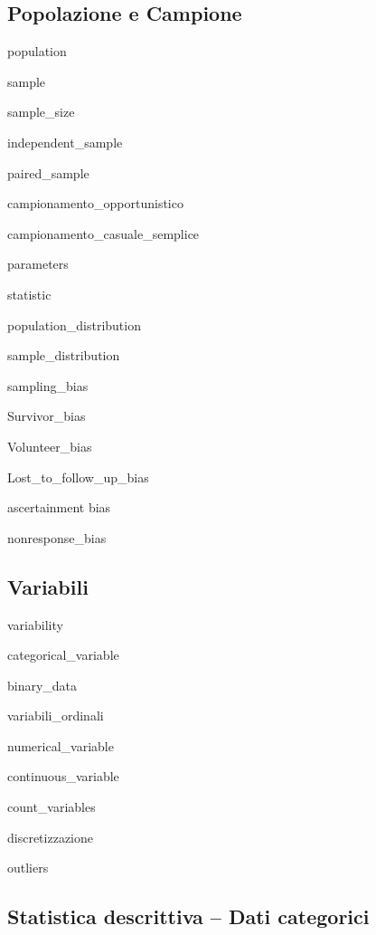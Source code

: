\documentclass{report}
\begin{document}
\subsection*{Popolazione e Campione}

\noindent \gls{population}

\noindent \gls{sample}

\noindent \gls{sample_size}

\noindent \gls{independent_sample}

\noindent \gls{paired_sample}

\noindent \gls{campionamento_opportunistico}

\noindent \gls{campionamento_casuale_semplice}

\noindent \gls{parameters}

\noindent \gls{statistic}

\noindent \gls{population_distribution}

\noindent \gls{sample_distribution}

\noindent \gls{sampling_bias}

\noindent \gls{Survivor_bias}

\noindent \gls{Volunteer_bias}

\noindent \gls{Lost_to_follow_up_bias}

\noindent \gls{ascertainment bias}

\noindent \gls{nonresponse_bias}




\subsection*{Variabili}

\noindent \gls{variability}

\noindent \gls{categorical_variable}

\noindent \gls{binary_data}

\noindent \gls{variabili_ordinali}

\noindent \gls{numerical_variable}

\noindent \gls{continuous_variable}

\noindent \gls{count_variables}

\noindent \gls{discretizzazione}

\noindent \gls{outliers}



\subsection*{Statistica descrittiva -- Dati categorici}
\end{document}
